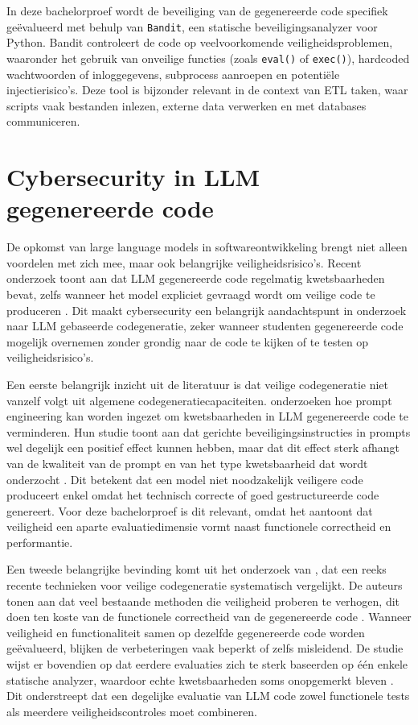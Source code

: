 In deze bachelorproef wordt de beveiliging van de gegenereerde code specifiek geëvalueerd met behulp van \texttt{Bandit}, een statische beveiligingsanalyzer voor Python. Bandit controleert de code op veelvoorkomende veiligheidsproblemen, waaronder het gebruik van onveilige functies (zoals \texttt{eval()} of \texttt{exec()}), hardcoded wachtwoorden of inloggegevens, subprocess aanroepen en potentiële injectierisico's. Deze tool is bijzonder relevant in de context van ETL taken, waar scripts vaak bestanden inlezen, externe data verwerken en met databases communiceren.


\section{Cybersecurity in LLM gegenereerde code}
\label{sec:cybersecurity_llm_code}

De opkomst van large language models in softwareontwikkeling brengt niet alleen voordelen met zich mee, maar ook belangrijke veiligheidsrisico's. Recent onderzoek toont aan dat LLM gegenereerde code regelmatig kwetsbaarheden bevat, zelfs wanneer het model expliciet gevraagd wordt om veilige code te produceren \autocite{Aldosari2026,Dai2025,Dora2025}. Dit maakt cybersecurity een belangrijk aandachtspunt in onderzoek naar LLM gebaseerde codegeneratie, zeker wanneer studenten gegenereerde code mogelijk overnemen zonder grondig naar de code te kijken of te testen op veiligheidsrisico's.

Een eerste belangrijk inzicht uit de literatuur is dat veilige codegeneratie niet vanzelf volgt uit algemene codegeneratiecapaciteiten. \textcite{Aldosari2026} onderzoeken hoe prompt engineering kan worden ingezet om kwetsbaarheden in LLM gegenereerde code te verminderen. Hun studie toont aan dat gerichte beveiligingsinstructies in prompts wel degelijk een positief effect kunnen hebben, maar dat dit effect sterk afhangt van de kwaliteit van de prompt en van het type kwetsbaarheid dat wordt onderzocht \autocite{Aldosari2026}. Dit betekent dat een model niet noodzakelijk veiligere code produceert enkel omdat het technisch correcte of goed gestructureerde code genereert. Voor deze bachelorproef is dit relevant, omdat het aantoont dat veiligheid een aparte evaluatiedimensie vormt naast functionele correctheid en performantie.

Een tweede belangrijke bevinding komt uit het onderzoek van \textcite{Dai2025}, dat een reeks recente technieken voor veilige codegeneratie systematisch vergelijkt. De auteurs tonen aan dat veel bestaande methoden die veiligheid proberen te verhogen, dit doen ten koste van de functionele correctheid van de gegenereerde code \autocite{Dai2025}. Wanneer veiligheid en functionaliteit samen op dezelfde gegenereerde code worden geëvalueerd, blijken de verbeteringen vaak beperkt of zelfs misleidend. De studie wijst er bovendien op dat eerdere evaluaties zich te sterk baseerden op één enkele statische analyzer, waardoor echte kwetsbaarheden soms onopgemerkt bleven \autocite{Dai2025}. Dit onderstreept dat een degelijke evaluatie van LLM code zowel functionele tests als meerdere veiligheidscontroles moet combineren.

